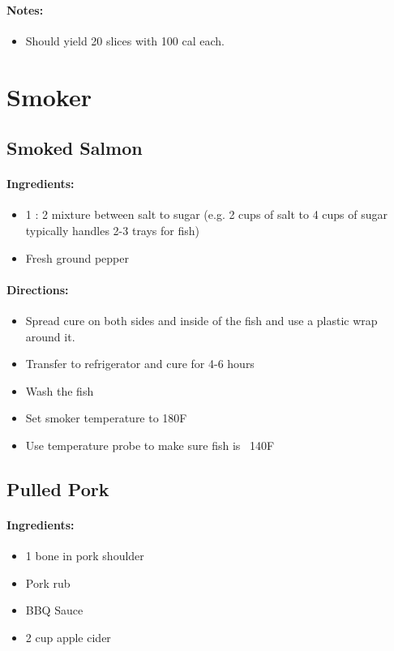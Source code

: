 \documentclass{article}
\begin{document}
\paragraph{Notes:}
\begin{itemize}
    \item Should yield 20 slices with 100 cal each.
\end{itemize}

\section{Smoker}


\subsection{Smoked Salmon}

\paragraph{Ingredients:}
\begin{itemize}
    \item 1 : 2 mixture between salt to sugar (e.g. 2 cups of salt to 4 cups of sugar typically handles 2-3 trays for fish)
    \item Fresh ground pepper
\end{itemize}

\paragraph{Directions:}
\begin{itemize}
    \item Spread cure on both sides and inside of the fish and use a plastic wrap around it.
    \item Transfer to refrigerator and cure for 4-6 hours
    \item Wash the fish
    \item Set smoker temperature to 180F
    \item Use temperature probe to make sure fish is ~140F
\end{itemize}

\subsection{Pulled Pork}

\paragraph{Ingredients:}
\begin{itemize}
    \item 1 bone in pork shoulder
    \item Pork rub
    \item BBQ Sauce
    \item 2 cup apple cider
\end{itemize}
\end{document}
